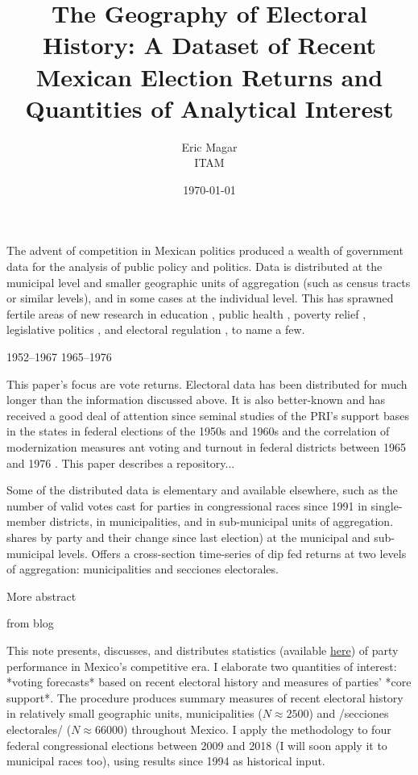 \documentclass[letter,12pt]{article}
\begin{document}
\title{The Geography of Electoral History: A Dataset of Recent Mexican Election Returns and Quantities of Analytical Interest}
\author{Eric Magar \\ ITAM}
\date{\today}
\maketitle

\noindent The advent of competition in Mexican politics produced a wealth of government data for the analysis of public policy and politics. Data is distributed at the municipal level and smaller geographic units of aggregation (such as census tracts or similar levels), and in some cases at the individual level. This has sprawned fertile areas of new research in education \citep{hoyos.etal.Enlace.2012}, public health \citep{king.etal.segPop.2007, imai.king.nall.segPop.2009}, poverty relief \citep{diaz-estevez-magaloni-Poverty-book.2016, molinar.weldon.1994}, legislative politics \citep{rosas.langston.2011, cantuDesposatoMagar.MxRcv.2014}, and electoral regulation \citep{estevez.magar.rosas.2008}, to name a few.

1952--1967
1965--1976

This paper's focus are vote returns. Electoral data has been distributed for much longer than the information discussed above. It is also better-known and has received a good deal of attention since seminal studies of the PRI's support bases in the states in federal elections of the 1950s and 1960s \citep{ames.1970} and the correlation of modernization measures ant voting and turnout in federal districts between 1965 and 1976 \citep{lehr.1985}. This paper describes a repository...

Some of the distributed data is elementary and available elsewhere, such as the number of valid votes cast for parties in congressional races since 1991 in single-member districts, in municipalities, and in sub-municipal units of aggregation.   shares by party and their change since last election) at the municipal and sub-municipal levels. Offers a cross-section time-series of dip fed returns at two levels of aggregation: municipalities and secciones electorales. 

More abstract

from blog

This note presents, discusses, and distributes statistics (available \href{https://github.com/emagar/mxDistritos}{here}) of party performance in Mexico's competitive era. I elaborate two quantities of interest: *voting forecasts* based on recent electoral history and measures of parties' *core support*. The procedure produces summary measures of recent electoral history in relatively small geographic units, municipalities ($N \approx 2500$) and /secciones electorales/ ($N \approx 66000$) throughout Mexico. I apply the methodology to four federal congressional elections between 2009 and 2018 (I will soon apply it to municipal races too), using results since 1994 as historical input.
\end{document}
